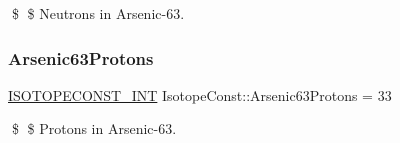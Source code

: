\$ \$ Neutrons in Arsenic-\/63. \mbox{\label{group___isotope_const-_arsenic-_as63_gacfd19e22116bdabb14aac3386da834c9}} 
\subsubsection{\texorpdfstring{Arsenic63\+Protons}{Arsenic63Protons}}
{\footnotesize\ttfamily \mbox{\hyperlink{group___isotope_const-_macros_ga5f18360b3e99483a35c32d789e62621c}{I\+S\+O\+T\+O\+P\+E\+C\+O\+N\+S\+T\+\_\+\+I\+NT}} Isotope\+Const\+::\+Arsenic63\+Protons = 33}

\$ \$ Protons in Arsenic-\/63. 